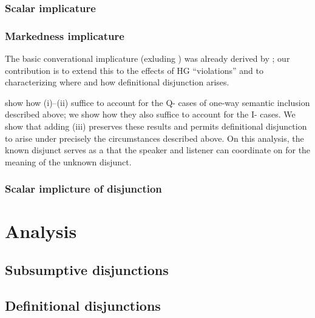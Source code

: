 \documentclass{article}
\begin{document}
\subsubsection{Scalar implicature}\label{sec:scalar}

\subsubsection{Markedness implicature}\label{sec:markedness}

The basic converational implicature (exluding ) was already
derived by \citealt{Bergen:Goodman:Levy:2012}; our contribution is to
extend this to the effects of HG ``violations'' and to characterizing
where and how definitional disjunction arises.

\citet{bergen-levy-goodman:2014} show how (i)--(ii) suffice to account
for the Q- cases of one-way semantic inclusion described above; we
show how they also suffice to account for the I- cases.  We show that
adding (iii) preserves these results and permits definitional
disjunction to arise under precisely the circumstances described
above. On this analysis, the known disjunct serves as a  that the speaker and listener can coordinate on for the
meaning of the unknown disjunct.

\subsubsection{Scalar implicture of disjunction}\label{sec:scalar-disj}


\section{Analysis}\label{sec:analysis}

\subsection{Subsumptive disjunctions}\label{sec:analysis:subsumptive}

\subsection{Definitional disjunctions}\label{sec:analysis:definitional}
\end{document}
